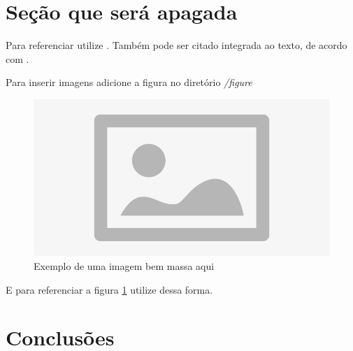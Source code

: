 \section{Seção que será apagada}

Para referenciar utilize \cite{ninguem2022curioso}. Também pode ser citado integrada ao texto, de acordo com .

Para inserir imagens adicione a figura no diretório \textit{/figure}

\begin{figure}[htbp!]
\centering
\includegraphics[width=1\textwidth]{figure/placeholder.jpg}
\caption{Exemplo de uma imagem bem massa aqui}
\label{fig:imagem_massa}
\end{figure}

E para referenciar a figura \ref{fig:imagem_massa} utilize dessa forma.




\section{Conclusões}

\lipsum[2-4]


